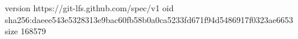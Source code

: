 version https://git-lfs.github.com/spec/v1
oid sha256:daeee543e5328313e9bac60fb58b0a0ca5233fd671f94d5486917f0323ae6653
size 168579
